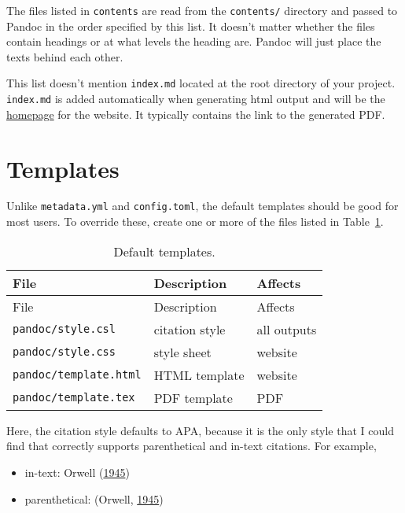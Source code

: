 \documentclass[
  14pt
  american,
  paper=a4,
  ,captions=tableheading
]{scrreprt}
\newcommand{\passthrough}[1]{#1}
\providecommand{\tightlist}{%
  \setlength{\itemsep}{0pt}\setlength{\parskip}{0pt}}
\begin{document}
The files listed in \passthrough{\lstinline!contents!} are read from the
\passthrough{\lstinline!contents/!} directory and passed to Pandoc in
the order specified by this list. It doesn't matter whether the files
contain headings or at what levels the heading are. Pandoc will just
place the texts behind each other.

This list doesn't mention \passthrough{\lstinline!index.md!} located at
the root directory of your project. \passthrough{\lstinline!index.md!}
is added automatically when generating html output and will be the
\href{/}{homepage} for the website. It typically contains the link to
the generated PDF.

\hypertarget{sec:templates}{%
\section{Templates}\label{sec:templates}}

Unlike \passthrough{\lstinline!metadata.yml!} and
\passthrough{\lstinline!config.toml!}, the default templates should be
good for most users. To override these, create one or more of the files
listed in Table~\ref{tbl:templates}.

\hypertarget{tbl:templates}{}
\begin{longtable}[]{@{}lll@{}}
\caption{\label{tbl:templates}Default templates.}\tabularnewline
\toprule
File & Description & Affects\tabularnewline
\midrule
\endfirsthead
\toprule
File & Description & Affects\tabularnewline
\midrule
\endhead
\passthrough{\lstinline!pandoc/style.csl!} & citation style & all
outputs\tabularnewline
\passthrough{\lstinline!pandoc/style.css!} & style sheet &
website\tabularnewline
\passthrough{\lstinline!pandoc/template.html!} & HTML template &
website\tabularnewline
\passthrough{\lstinline!pandoc/template.tex!} & PDF template &
PDF\tabularnewline
\bottomrule
\end{longtable}

Here, the citation style defaults to APA, because it is the only style
that I could find that correctly supports parenthetical and in-text
citations. For example,

\begin{itemize}
\tightlist
\item
  in-text: Orwell (\protect\hyperlink{ref-orwell1945animal}{1945})
\item
  parenthetical: (Orwell,
  \protect\hyperlink{ref-orwell1945animal}{1945})
\end{itemize}
\end{document}
